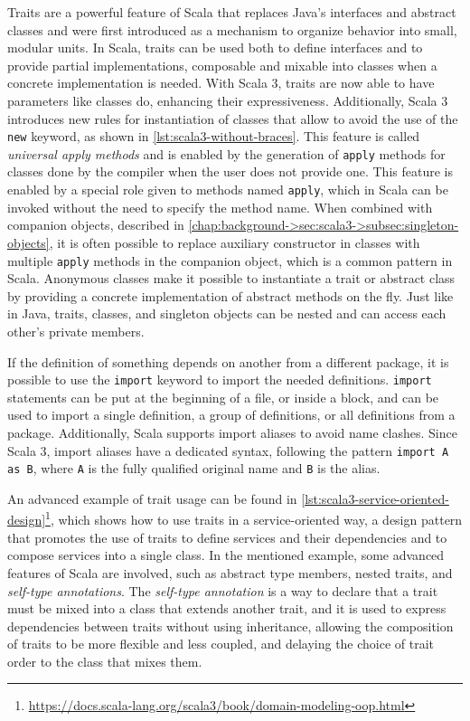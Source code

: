 Traits are a powerful feature of Scala that replaces Java's interfaces and abstract classes and were first introduced as a mechanism to organize behavior into small, modular units\cite{traits}.
%
In Scala, traits can be used both to define interfaces and to provide partial implementations, composable and mixable into classes when a concrete implementation is needed.
%
With Scala 3, traits are now able to have parameters like classes do, enhancing their expressiveness.
%
Additionally, Scala 3 introduces new rules for instantiation of classes that allow to avoid the use of the \texttt{new} keyword, as shown in \cref{lst:scala3-without-braces}.
%
This feature is called \textit{universal apply methods} and is enabled by the generation of \texttt{apply} methods for classes done by the compiler when the user does not provide one.
%
This feature is enabled by a special role given to methods named \texttt{apply}, which in Scala can be invoked without the need to specify the method name.
%
When combined with companion objects, described in \cref{chap:background->sec:scala3->subsec:singleton-objects}, it is often possible to replace auxiliary constructor in classes with multiple \texttt{apply} methods in the companion object, which is a common pattern in Scala.
%
Anonymous classes make it possible to instantiate a trait or abstract class by providing a concrete implementation of abstract methods on the fly.
%
Just like in Java, traits, classes, and singleton objects can be nested and can access each other's private members.

If the definition of something depends on another from a different package, it is possible to use the \texttt{import} keyword to import the needed definitions.
%
\texttt{import} statements can be put at the beginning of a file, or inside a block, and can be used to import a single definition, a group of definitions, or all definitions from a package.
%
Additionally, Scala supports import aliases to avoid name clashes.
%
Since Scala 3, import aliases have a dedicated syntax, following the pattern \texttt{import A as B}, where \texttt{A} is the fully qualified original name and \texttt{B} is the alias.

An advanced example of trait usage can be found in \cref{lst:scala3-service-oriented-design}\footnote{\url{https://docs.scala-lang.org/scala3/book/domain-modeling-oop.html}}, which shows how to use traits in a service-oriented way, a design pattern that promotes the use of traits to define services and their dependencies and to compose services into a single class\cite{service-oriented-design}.
%
In the mentioned example, some advanced features of Scala are involved, such as abstract type members, nested traits, and \textit{self-type annotations}.
%
The \textit{self-type annotation} is a way to declare that a trait must be mixed into a class that extends another trait, and it is used to express dependencies between traits without using inheritance, allowing the composition of traits to be more flexible and less coupled, and delaying the choice of trait order to the class that mixes them.

